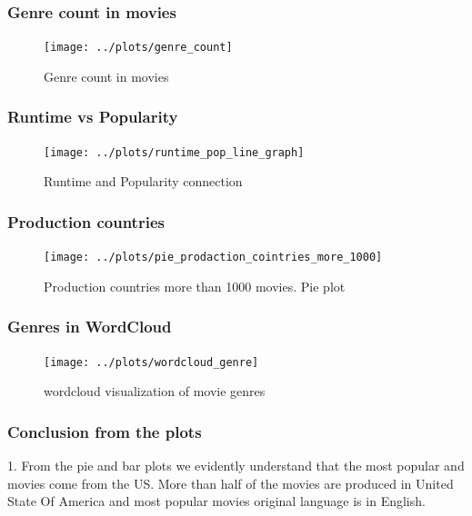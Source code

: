 \documentclass{beamer}
\begin{document}
\begin{frame}
\frametitle{Genre count in movies}

\begin{figure}

	\centering
	\texttt{[image: ../plots/genre\_count]}
	\caption{Genre count in movies}
	\label{fig:genre_count}
	
\end{figure}

\end{frame}

\begin{frame}
\frametitle{Runtime vs Popularity}

\begin{figure}
	
	\centering
	\texttt{[image: ../plots/runtime\_pop\_line\_graph]}
	\caption{Runtime and Popularity connection}
	\label{fig:runtime_vs_pop}
	
\end{figure}

\end{frame}

\begin{frame}
\frametitle{Production countries}

\begin{figure}
	
	\centering
	\texttt{[image: ../plots/pie\_prodaction\_cointries\_more\_1000]}
	\caption{Production countries more than 1000 movies. Pie plot}
	\label{fig:production_countries}
	
\end{figure}

\end{frame}


\begin{frame}
\frametitle{Genres in WordCloud}

\begin{figure}
	
	\centering
	\texttt{[image: ../plots/wordcloud\_genre]}
	\caption{wordcloud visualization of movie genres}
	\label{fig:genres}
	
\end{figure}

\end{frame}

\begin{frame}
\frametitle{Conclusion from the plots}

1. From the pie and bar plots we evidently understand that the most popular and movies come from the US. More than half of the movies are produced in United State Of America and most popular movies original language is in English. 
\end{frame}
\end{document}
